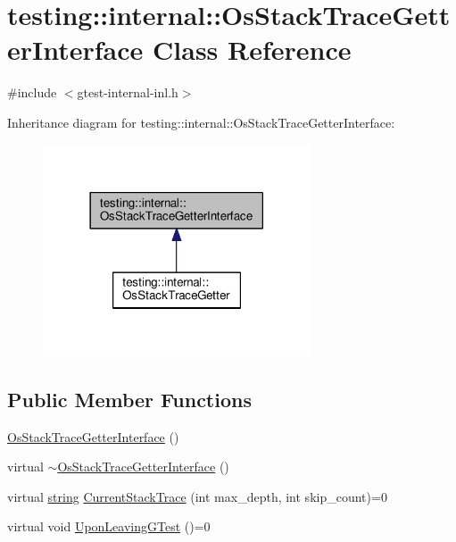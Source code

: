 \hypertarget{classtesting_1_1internal_1_1OsStackTraceGetterInterface}{}\section{testing\+:\+:internal\+:\+:Os\+Stack\+Trace\+Getter\+Interface Class Reference}
\label{classtesting_1_1internal_1_1OsStackTraceGetterInterface}


{\ttfamily \#include $<$gtest-\/internal-\/inl.\+h$>$}



Inheritance diagram for testing\+:\+:internal\+:\+:Os\+Stack\+Trace\+Getter\+Interface\+:
\nopagebreak
\begin{figure}[H]
\begin{center}
\leavevmode
\includegraphics[width=225pt]{classtesting_1_1internal_1_1OsStackTraceGetterInterface__inherit__graph}
\end{center}
\end{figure}
\subsection*{Public Member Functions}
\begin{DoxyCompactItemize}
\item 
\hyperlink{classtesting_1_1internal_1_1OsStackTraceGetterInterface_afbe9eb0ca8775fbb98ff0720011b6708}{Os\+Stack\+Trace\+Getter\+Interface} ()
\item 
virtual \hyperlink{classtesting_1_1internal_1_1OsStackTraceGetterInterface_a193f4a1de4af9b78010c659912df5a15}{$\sim$\+Os\+Stack\+Trace\+Getter\+Interface} ()
\item 
virtual \hyperlink{namespacetesting_1_1internal_a8e8ff5b11e64078831112677156cb111}{string} \hyperlink{classtesting_1_1internal_1_1OsStackTraceGetterInterface_a6965eadb9b340808718fab9f1475c49a}{Current\+Stack\+Trace} (int max\+\_\+depth, int skip\+\_\+count)=0
\item 
virtual void \hyperlink{classtesting_1_1internal_1_1OsStackTraceGetterInterface_a791bd120428b5a53d5eeba1b27296a39}{Upon\+Leaving\+G\+Test} ()=0
\end{DoxyCompactItemize}
